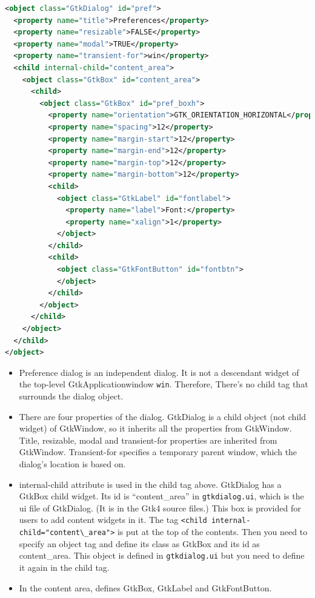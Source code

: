 \begin{lstlisting}[language=XML]
<object class="GtkDialog" id="pref">
  <property name="title">Preferences</property>
  <property name="resizable">FALSE</property>
  <property name="modal">TRUE</property>
  <property name="transient-for">win</property>
  <child internal-child="content_area">
    <object class="GtkBox" id="content_area">
      <child>
        <object class="GtkBox" id="pref_boxh">
          <property name="orientation">GTK_ORIENTATION_HORIZONTAL</property>
          <property name="spacing">12</property>
          <property name="margin-start">12</property>
          <property name="margin-end">12</property>
          <property name="margin-top">12</property>
          <property name="margin-bottom">12</property>
          <child>
            <object class="GtkLabel" id="fontlabel">
              <property name="label">Font:</property>
              <property name="xalign">1</property>
            </object>
          </child>
          <child>
            <object class="GtkFontButton" id="fontbtn">
            </object>
          </child>
        </object>
      </child>
    </object>
  </child>
</object>
\end{lstlisting}

\begin{itemize}
\tightlist
\item
  Preference dialog is an independent dialog. It is not a descendant
  widget of the top-level GtkApplicationwindow
  \passthrough{\lstinline!win!}. Therefore, There's no child tag that
  surrounds the dialog object.
\item
  There are four properties of the dialog. GtkDialog is a child object
  (not child widget) of GtkWindow, so it inherits all the properties
  from GtkWindow. Title, resizable, modal and transient-for properties
  are inherited from GtkWindow. Transient-for specifies a temporary
  parent window, which the dialog's location is based on.
\item
  internal-child attribute is used in the child tag above. GtkDialog has
  a GtkBox child widget. Its id is ``content\_area'' in
  \passthrough{\lstinline!gtkdialog.ui!}, which is the ui file of
  GtkDialog. (It is in the Gtk4 source files.) This box is provided for
  users to add content widgets in it. The tag
  \passthrough{\lstinline!<child internal-child="content\_area">!} is
  put at the top of the contents. Then you need to specify an object tag
  and define its class as GtkBox and its id as content\_area. This
  object is defined in \passthrough{\lstinline!gtkdialog.ui!} but you
  need to define it again in the child tag.
\item
  In the content area, defines GtkBox, GtkLabel and GtkFontButton.
\end{itemize}

